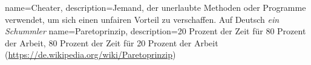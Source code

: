 {
  name={Cheater},
  description={Jemand, der unerlaubte Methoden oder Programme verwendet, um sich einen unfairen Vorteil zu verschaffen.
  Auf Deutsch \textit{ein Schummler}}
}
{
  name={Paretoprinzip},
  description={20 Prozent der Zeit für 80 Prozent der Arbeit, 80 Prozent der Zeit für 20 Prozent der Arbeit (\url{https://de.wikipedia.org/wiki/Paretoprinzip})}
}



